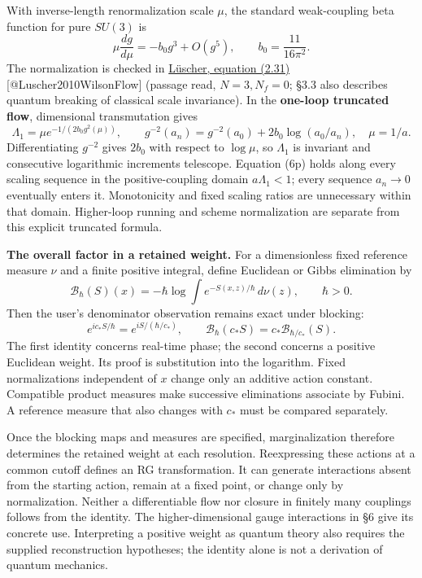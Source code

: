 \documentclass[11pt,a4paper]{article}
\begin{document}
With inverse-length renormalization scale \(\mu\), the standard
weak-coupling beta function for pure \(SU(3)\) is
\[\mu\frac{dg}{d\mu}=-b_0g^3+O(g^5),\qquad
b_0=\frac{11}{16\pi^2}.\] The normalization is checked in
\href{https://arxiv.org/pdf/1006.4518v3}{Lüscher, equation (2.31)}
{[}@Luscher2010WilsonFlow{]} (passage read, \(N=3,N_f=0\); §3.3 also
describes quantum breaking of classical scale invariance). In the
\textbf{one-loop truncated flow}, dimensional transmutation gives
\[\Lambda_1=\mu e^{-1/(2b_0g^2(\mu))},\qquad
g^{-2}(a_n)=g^{-2}(a_0)+2b_0\log(a_0/a_n),\quad\mu=1/a.
\tag{6p}\] Differentiating \(g^{-2}\) gives \(2b_0\) with respect to
\(\log\mu\), so \(\Lambda_1\) is invariant and consecutive logarithmic
increments telescope. Equation (6p) holds along every scaling sequence
in the positive-coupling domain \(a\Lambda_1<1\); every sequence
\(a_n\to0\) eventually enters it. Monotonicity and fixed scaling ratios
are unnecessary within that domain. Higher-loop running and scheme
normalization are separate from this explicit truncated formula.

\textbf{The overall factor in a retained weight.} For a dimensionless
fixed reference measure \(\nu\) and a finite positive integral, define
Euclidean or Gibbs elimination by \[\mathcal B_\hbar(S)(x)
 =-\hbar\log\int e^{-S(x,z)/\hbar}\,d\nu(z),\qquad \hbar>0.\] Then the
user's denominator observation remains exact under blocking:
\[e^{ic_*S/\hbar}=e^{iS/(\hbar/c_*)},\qquad
\mathcal B_\hbar(c_*S)=c_*\mathcal B_{\hbar/c_*}(S).
\tag{6q}\] The first identity concerns real-time phase; the second
concerns a positive Euclidean weight. Its proof is substitution into the
logarithm. Fixed normalizations independent of \(x\) change only an
additive action constant. Compatible product measures make successive
eliminations associate by Fubini. A reference measure that also changes
with \(c_*\) must be compared separately.

Once the blocking maps and measures are specified, marginalization
therefore determines the retained weight at each resolution.
Reexpressing these actions at a common cutoff defines an RG
transformation. It can generate interactions absent from the starting
action, remain at a fixed point, or change only by normalization.
Neither a differentiable flow nor closure in finitely many couplings
follows from the identity. The higher-dimensional gauge interactions in
§6 give its concrete use. Interpreting a positive weight as quantum
theory also requires the supplied reconstruction hypotheses; the
identity alone is not a derivation of quantum mechanics.
\end{document}
